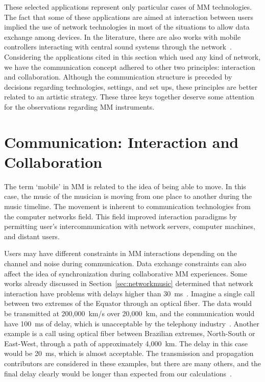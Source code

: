 These selected applications represent only particular cases of MM technologies.
The fact that some of these applications are aimed at interaction between users implied the use of network technologies in most of the situations to allow data exchange among devices.
In the literature, there are also works with mobile controllers interacting with central sound systems through the network~\citep{Weitzner2012massmobile,Allison2013nexus,Hindle2013swarmed}.
Considering the applications cited in this section which used any kind of network, we have the communication concept adhered to other two principles: interaction and collaboration.
Although the communication structure is preceded by decisions regarding technologies, settings, and set ups, these principles are better related to an artistic strategy.
These three keys together deserve some attention for the observations regarding MM instruments.






\section{Communication: Interaction and Collaboration}
\label{sec:communication}

The term `mobile' in MM is related to the idea of being able to move.
In this case, the music of the musician is moving from one place to another during the music timeline.
The movement is inherent to communication technologies from the computer networks field.
This field improved interaction paradigms by permitting user's intercommunication with network servers, computer machines, and distant users.

Users may have different constraints in MM interactions depending on the channel and noise during communication. 
Data exchange constraints can also affect the idea of synchronization during collaborative MM experiences.
Some works already discussed in Section~\ref{sec:networkmusic} determined that network interaction have problems with delays higher than 30~ms~\cite{Lago2004thequest}.
Imagine a single call between two extremes of the Equator through an optical fiber.
The data would be transmitted at 200,000~km/s over 20,000~km, and the communication would have 100~ms of delay, which is unacceptable by the telephony industry~\citep{Cheshire1996latency}.
Another example is a call using optical fiber between Brazilian extremes, North-South or East-West, through a path of approximately 4,000~km.
The delay in this case would be 20~ms, which is almost acceptable.
The transmission and propagation contributors are considered in these examples, but there are many others, and the final delay clearly would be longer than expected from our calculations~\citep[p.~8831]{Rottondi2016overview}.

